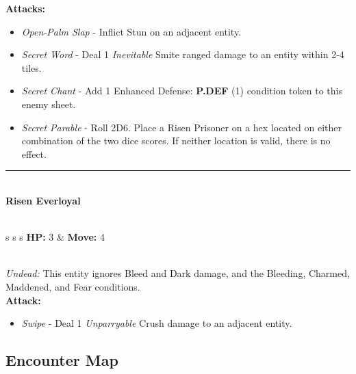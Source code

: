 \textbf{Attacks:}
\begin{itemize}
\item \emph{Open-Palm Slap} -  Inflict Stun on an adjacent entity.
\item \emph{Secret Word} - Deal 1 \emph{Inevitable} Smite ranged damage to an entity within 2-4 tiles.
\item \emph{Secret Chant} - Add 1 Enhanced Defense: \textbf{P.DEF} (1) condition token to this enemy sheet.
\item \emph{Secret Parable} - Roll 2D6. Place a Risen Prisoner on a hex located on either combination of the two dice scores. If neither location is valid, there is no effect.
\end{itemize}
\hrule
\ \\
{\large \textbf{Risen Everloyal}}\\\\
\begin{tabular}{s s s}
\textbf{HP:} 3 & \textbf{Move:} 4\\
\end{tabular}\\

\emph{Undead:} This entity ignores Bleed and Dark damage, and the Bleeding, Charmed, Maddened, and Fear conditions.\\

\textbf{Attack:}
\begin{itemize}
\item \emph{Swipe} - Deal 1 \emph{Unparryable} Crush damage to an adjacent entity.
\end{itemize}

\pagebreak

\subsection*{Encounter Map}
\begin{center}
\end{center}

